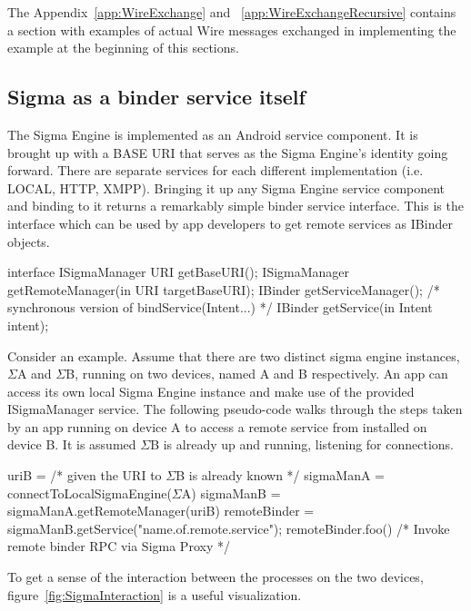 \documentclass[prodmode]{acmlarge}
\begin{document}
The Appendix~\ref{app:WireExchange} and ~\ref{app:WireExchangeRecursive} contains a section with examples of actual Wire messages exchanged in implementing the example at the beginning of this sections.

\subsection{Sigma as a binder service itself}
The Sigma Engine is implemented as an Android service component. It is brought up with a BASE URI that serves as the Sigma Engine's identity going forward. There are separate services for each different implementation (i.e. LOCAL, HTTP, XMPP). Bringing it up any Sigma Engine service component and binding to it returns a remarkably simple binder service interface. This is the interface which can be used by app developers to get remote services as IBinder objects.

\begin{snippet}
interface ISigmaManager {
    URI getBaseURI();
    ISigmaManager getRemoteManager(in URI targetBaseURI);
    IBinder getServiceManager();
    /* synchronous version of bindService(Intent...) */
    IBinder getService(in Intent intent);
}
\end{snippet}

Consider an example. Assume that there are two distinct sigma engine instances, $\Sigma$A and $\Sigma$B, running on two devices, named A and B respectively. An app can access its own local Sigma Engine instance and make use of the provided ISigmaManager service. The following pseudo-code walks through the steps taken by an app running on device A to access a remote service from installed on device B. It is assumed $\Sigma$B is already up and running, listening for connections.

\begin{snippet}
uriB = /* given the URI to $\Sigma$B is already known */
sigmaManA = connectToLocalSigmaEngine($\Sigma$A)
sigmaManB = sigmaManA.getRemoteManager(uriB)
remoteBinder = sigmaManB.getService("name.of.remote.service");
remoteBinder.foo() /* Invoke remote binder RPC via Sigma Proxy */
\end{snippet}

To get a sense of the interaction between the processes on the two devices, figure~\ref{fig:SigmaInteraction} is a useful visualization.
\end{document}
